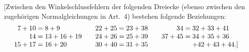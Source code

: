 [Zwischen den Winkelschlussfehlern der folgenden Dreiecke (ebenso zwischen den zugehörigen Normalgleichungen in Art.~4) bestehen folgende Beziehungen:
\[
\begin{array}{r@{\;}c@{\;}l@{\qquad}r@{\;}c@{\;}l@{\qquad}r@{\;}c@{\;}l}
7+10&=&8+9&22+25&=&23+38&34&=&32+33+41\\
14&=&13+16+19&24+26&=&25+39&37+45&=&34+35+36\\
15+17&=&16+20&30+40&=&31+35&&&+42+43+44.\text{]}
\end{array}
\]
\endgroup
